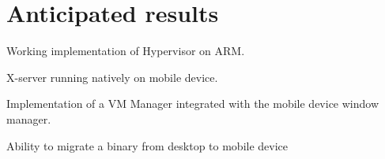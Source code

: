 \section{Anticipated results}
	\begin{itemize*}
	\item Working implementation of Hypervisor on ARM.
  \item X-server running natively on mobile device.
	\item Implementation of a VM Manager integrated with the mobile device window manager.
	\item Ability to migrate a binary from desktop to mobile device
	\end{itemize*}
